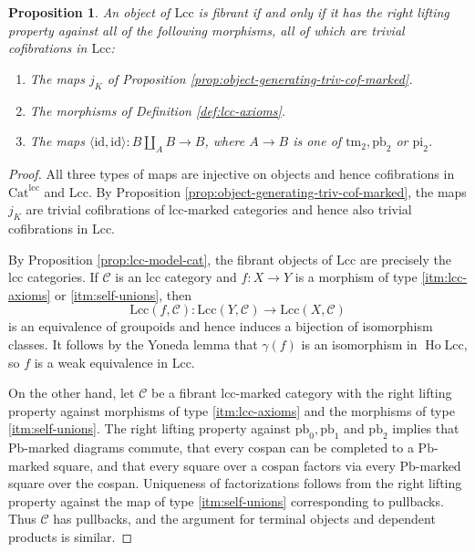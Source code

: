 \documentclass[a4paper]{article}
\newtheorem{proposition}[theorem]{Proposition}
\theoremstyle{remark}
\theoremstyle{definition}
\begin{document}
\begin{proposition}
  \label{prop:object-generating-triv-cof-lcc}
  An object of $\mathrm{Lcc}$ is fibrant if and only if it has the right lifting property against all of the following morphisms, all of which are trivial cofibrations in $\mathrm{Lcc}$:
  \begin{enumerate}[label={(\arabic*)}]
    \item
      \label{itm:marking-stability}
      The maps $j_K$ of Proposition \ref{prop:object-generating-triv-cof-marked}.
    \item
      \label{itm:lcc-axioms}
      The morphisms of Definition \ref{def:lcc-axioms}.
    \item
      \label{itm:self-unions}
      The maps $\langle \mathrm{id}, \mathrm{id} \rangle : B \amalg_A B \rightarrow B$, where $A \rightarrow B$  is one of $\mathrm{tm}_2, \mathrm{pb}_2$ or $\mathrm{pi}_2$.
  \end{enumerate}
\end{proposition}
\begin{proof}
  All three types of maps are injective on objects and hence cofibrations in $\mathrm{Cat}^{\mathrm{lcc}}$ and $\mathrm{Lcc}$.
  By Proposition \ref{prop:object-generating-triv-cof-marked}, the maps $j_K$ are trivial cofibrations of lcc-marked categories and hence also trivial cofibrations in $\mathrm{Lcc}$.

  By Proposition \ref{prop:lcc-model-cat}, the fibrant objects of $\mathrm{Lcc}$ are precisely the lcc categories. 
  If $\mathcal{C}$ is an lcc category and $f : X \rightarrow Y$ is a morphism of type \ref{itm:lcc-axioms} or \ref{itm:self-unions}, then 
  \begin{equation}
    \mathrm{Lcc}(f, \mathcal{C}) : \mathrm{Lcc}(Y, \mathcal{C}) \rightarrow \mathrm{Lcc}(X, \mathcal{C})
  \end{equation}
  is an equivalence of groupoids and hence induces a bijection of isomorphism classes.
  It follows by the Yoneda lemma that $\gamma(f)$ is an isomorphism in $\operatorname{Ho} \mathrm{Lcc}$, so $f$ is  a weak equivalence in $\mathrm{Lcc}$.

  On the other hand, let $\mathcal{C}$ be a fibrant lcc-marked category with the right lifting property against morphisms of type \ref{itm:lcc-axioms} and the morphisms of type \ref{itm:self-unions}.
  The right lifting property against $\mathrm{pb}_0, \mathrm{pb}_1$ and $\mathrm{pb}_2$ implies that $\mathrm{Pb}$-marked diagrams commute, that every cospan can be completed to a $\mathrm{Pb}$-marked square, and that every square over a cospan factors via every $\mathrm{Pb}$-marked square over the cospan.
  Uniqueness of factorizations follows from the right lifting property against the map of type \ref{itm:self-unions} corresponding to pullbacks.
  Thus $\mathcal{C}$ has pullbacks, and the argument for terminal objects and dependent products is similar.
\end{proof}
\end{document}
